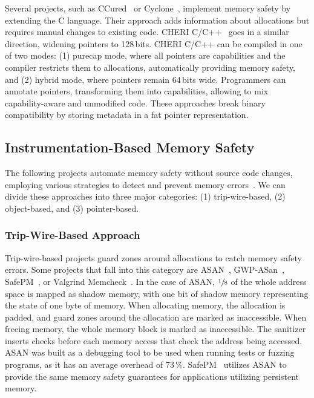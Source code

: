 Several projects, such as CCured~\cite{necula2002ccured} or Cyclone~\cite{jim2002cyclone}, implement memory safety by extending the C language.
Their approach adds information about allocations but requires manual changes to existing code.
CHERI C/C++~\cite{watson_cheri_2020} goes in a similar direction, widening pointers to 128\,bits.
CHERI C/C++ can be compiled in one of two modes: (1) purecap mode, where all pointers are capabilities and the compiler restricts them to allocations, automatically providing memory safety, and (2) hybrid mode, where pointers remain 64\,bits wide.
Programmers can annotate pointers, transforming them into capabilities, allowing to mix capability-aware and unmodified code.
These approaches break binary compatibility by storing metadata in a fat pointer representation.

\subsection{Instrumentation-Based Memory Safety}
\label{subsec:automatic-approaches}

The following projects automate memory safety without source code changes, employing various strategies to detect and prevent memory errors~\cite{serebryany2012addresssanitizer,serebryany2023gwp,nethercote2007valgrind}.
We can divide these approaches into three major categories: (1) trip-wire-based, (2) object-based, and (3) pointer-based.

\subsubsection{Trip-Wire-Based Approach}

Trip-wire-based projects guard zones around allocations to catch memory safety errors.
Some projects that fall into this category are \ac{ASAN}~\cite{serebryany2012addresssanitizer}, GWP-ASan~\cite{serebryany2023gwp}, SafePM~\cite{bozdougan2022safepm}, or Valgrind Memcheck~\cite{nethercote2007valgrind}.
In the case of \ac{ASAN}, $\sfrac{1}{8}$ of the whole address space is mapped as shadow memory, with one bit of shadow memory representing the state of one byte of memory.
When allocating memory, the allocation is padded, and guard zones around the allocation are marked as inaccessible.
When freeing memory, the whole memory block is marked as inaccessible.
The sanitizer inserts checks before each memory access that check the address being accessed.
\Ac{ASAN} was built as a debugging tool to be used when running tests or fuzzing programs, as it has an average overhead of 73\,\%.
SafePM~\cite{bozdougan2022safepm} utilizes \ac{ASAN} to provide the same memory safety guarantees for applications utilizing persistent memory.

